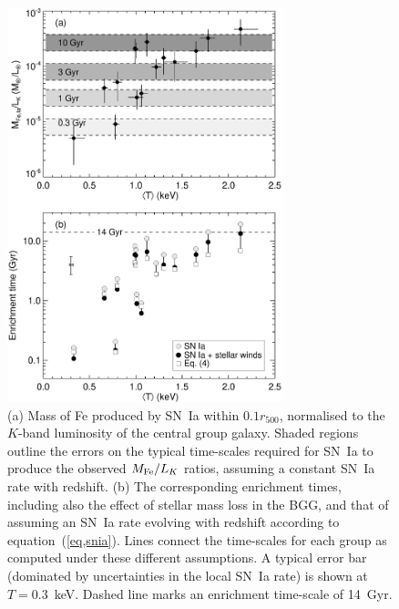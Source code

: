 \documentclass[useAMS,usenatbib]{mn2e}
\begin{document}
\begin{figure} 
 \hspace{0mm} 
 \includegraphics[width=80mm]{fig12.eps}
 \caption{(a) Mass of Fe produced by SN~Ia within $0.1r_{500}$,
   normalised to the $K$-band luminosity of the central group
   galaxy. Shaded regions outline the errors on the typical
   time-scales required for SN~Ia to produce the observed $M_{\rm
   Fe}/L_K$ ratios, assuming a constant SN~Ia rate with redshift.  (b)
   The corresponding enrichment times, including also the effect of
   stellar mass loss in the BGG, and that of assuming an SN~Ia rate
   evolving with redshift according to equation~(\ref{eq,snia}). Lines
   connect the time-scales for each group as computed under these
   different assumptions. A typical error bar (dominated by
   uncertainties in the local SN~Ia rate) is shown at $T=0.3$~keV.
   Dashed line marks an enrichment time-scale of 14~Gyr.}
\label{fig,MFe_Lk} 
\end{figure}  
\end{document}
